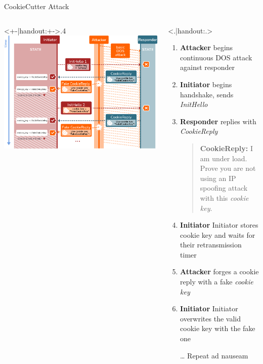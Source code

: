 \begin{frame}{CookieCutter Attack}
    \begin{columns}[fullwidth,T]
      \begin{column}<+-|handout:+->{.4\linewidth}
        \includegraphics[height=.85\textheight]{graphics/cookiecutter-bare}
      \end{column}
      \begin{column}{.4\linewidth}
      \small
      \only<.|handout:.>{
      	\vspace{-\ht\strutbox}
          \begin{enumerate}
            \item \textbf{Attacker} begins continuous DOS attack against responder
            \item \textbf{Initiator} begins handshake, sends \emph{InitHello}
            \item \textbf{Responder} replies with \emph{CookieReply}
              \blockquote{\textbf{CookieReply:} I am under load. Prove you are not using an IP spoofing attack with this \emph{cookie key}.}
            \item \textbf{Initiator} Initiator stores cookie key and waits for their retransmission timer
            \item \textbf{Attacker} forges a cookie reply with a fake \emph{cookie key}
            \item \textbf{Initiator} Initiator overwrites the valid cookie key with the fake one
            \item[…] Repeat ad nauseam
          \end{enumerate}
      }


\end{column}
\end{columns}
\end{frame}
